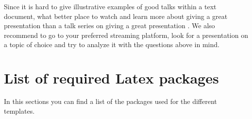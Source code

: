 \documentclass[twocolumn]{mlai-guide}
\newif\ifchecklist
\begin{document}
Since it is hard to give illustrative examples of good talks within a text document, what better place to watch and learn more about giving a great presentation than a talk series on giving a great presentation \autocite{tedTEDTalksFull}. We also recommend to go to your preferred streaming platform, look for a presentation on a topic of choice and try to analyze it with the questions above in mind. 

 


\printbibliography

\appendix

\checklisttrue
\ifchecklist 
\newpage
\onecolumn

\twocolumn
\else
\fi 
\newpage
\section{List of required Latex packages}
In this sections you can find a list of the packages used for the different templates.
\end{document}
